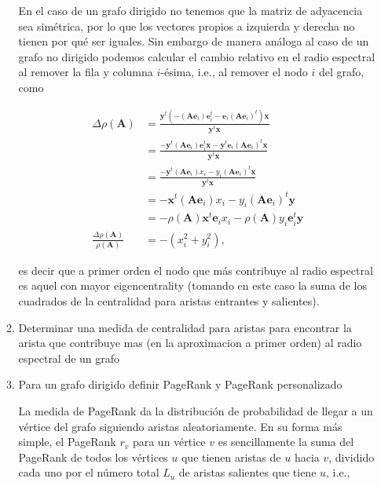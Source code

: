 \documentclass[answers]{exam}
\begin{document}
\begin{questions}
\begin{enumerate}
\begin{enumerate}
\begin{solution}
En el caso de un grafo dirigido no tenemos que la matriz de adyacencia sea simétrica, por lo que los vectores propios a izquierda y derecha no tienen por qué ser iguales. Sin embargo de manera análoga al caso de un grafo no dirigido podemos calcular el cambio relativo en el radio espectral al remover la fila y columna $i$-ésima, i.e., al remover el nodo $i$ del grafo, como

\begin{align*}
    \Delta\rho(\mathbf{A}) &= \frac{\mathbf{y}^t(-(\mathbf{Ae}_i)\mathbf{e}_i^t - \mathbf{e}_i(\mathbf{Ae}_i)^t)\mathbf{x}}{\mathbf{y}^t\mathbf{x}}\\
    &= \frac{-\mathbf{y}^t(\mathbf{Ae}_i)\mathbf{e}_i^t\mathbf{x} - \mathbf{y}^t\mathbf{e}_i(\mathbf{Ae}_i)^t\mathbf{x}}{\mathbf{y}^t\mathbf{x}}\\
    &= \frac{-\mathbf{y}^t(\mathbf{Ae}_i)x_i - y_i(\mathbf{Ae}_i)^t\mathbf{x}}{\mathbf{y}^t\mathbf{x}}\\
    &= -\mathbf{x}^t(\mathbf{Ae}_i)x_i - y_i(\mathbf{Ae}_i)^t\mathbf{y}\\
    &= -\rho(\mathbf{A})\mathbf{x}^t\mathbf{e}_ix_i - \rho(\mathbf{A})y_i\mathbf{e}_i^t\mathbf{y}\\
    \frac{\Delta\rho(\mathbf{A})}{\rho(\mathbf{A})} &= -(x_i^2 + y_i^2),
\end{align*}

es decir que a primer orden el nodo que más contribuye al radio espectral es aquel con mayor eigencentrality (tomando en este caso la suma de los cuadrados de la centralidad para aristas entrantes y salientes).
\end{solution}

\item Determinar una medida de centralidad para aristas para encontrar la arista que contribuye mas (en la aproximacion a primer orden) al radio espectral de un grafo

\begin{solution}

\end{solution}

\item Para un grafo dirigido definir PageRank y PageRank personalizado

\begin{solution}
La medida de PageRank da la distribución de probabilidad de llegar a un vértice del grafo siguiendo aristas aleatoriamente. En su forma más simple, el PageRank $r_v$ para un vértice $v$ es sencillamente la suma del PageRank de todos los vértices $u$ que tienen aristas de $u$ hacia $v$, dividido cada uno por el número total $L_u$ de aristas salientes que tiene $u$, i.e.,


\end{solution}
\end{enumerate}
\end{enumerate}
\end{questions}
\end{document}
